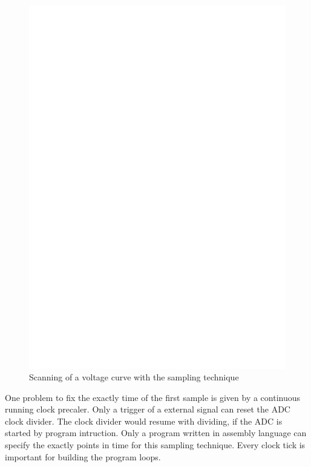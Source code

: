 \begin{figure}[H]
\centering
\includegraphics[width=18cm]{../FIG/sampling.eps}
\caption{Scanning of a voltage curve with the sampling technique}
\label{fig:sampling}
\end{figure}

One problem to fix the exactly time of the first sample is given by a continuous running clock precaler.
Only a trigger of a external signal can reset the ADC clock divider.
The clock divider would resume with dividing, if the ADC is started by program intruction.
Only a program written in assembly language can specify the exactly points in time for
this sampling technique. Every clock tick is important for building the program loops.

